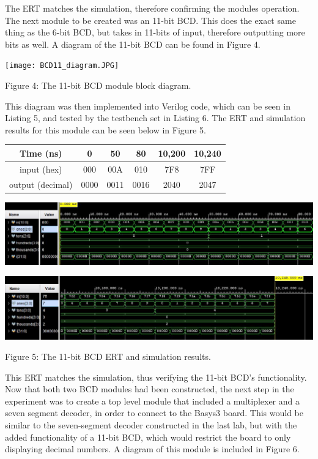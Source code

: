 \documentclass[11pt]{article}
\begin{document}
The ERT matches the simulation, therefore confirming the modules operation. The next module to be created was an 11-bit BCD. This does the exact same thing as the 6-bit BCD, but takes in 11-bits of input, therefore outputting more bits as well. A diagram of the 11-bit BCD can be found in Figure 4. 

\begin{center}

	\texttt{[image: BCD11\_diagram.JPG]}

	Figure 4: The 11-bit BCD module block diagram.
	
\end{center}

This diagram was then implemented into Verilog code, which can be seen in Listing 5, and tested by the testbench set in Listing 6. The ERT and simulation results for this module can be seen below in Figure 5. 

\begin{center}
	
	\begin{tabular}{c|ccccc}
		\toprule
		Time (ns) & 0 & 50 & 80 & 10,200 & 10,240\\
		\midrule
		input (hex) & 000 & 00A & 010 & 7F8 & 7FF\\
		\midrule
		output (decimal) & 0000 & 0011 & 0016 & 2040 & 2047\\
		\bottomrule
	\end{tabular} 
	
	
	\includegraphics[width=\textwidth]{bcd11.JPG}
	
	\includegraphics[width=\textwidth]{bcd11_end.JPG}
	
	Figure 5: The 11-bit BCD ERT and simulation results.
\end{center}

This ERT matches the simulation, thus verifying the 11-bit BCD's functionality. Now that both two BCD modules had been constructed, the next step in the experiment was to create a top level module that included a multiplexer and a seven segment decoder, in order to connect to the Basys3 board. This would be similar to the seven-segment decoder constructed in the last lab, but with the added functionality of a 11-bit BCD, which would restrict the board to only displaying decimal numbers. A diagram of this module is included in Figure 6.
\end{document}
